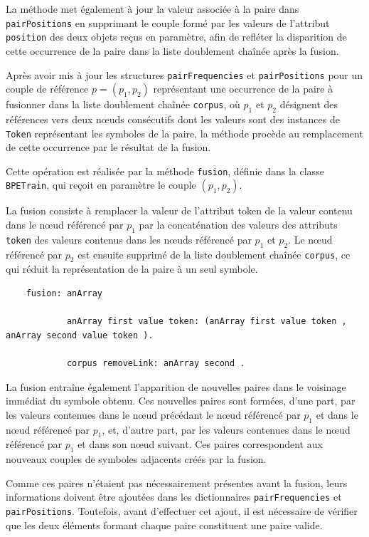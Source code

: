 \documentclass[12pt,a4paper]{report}
\begin{document}
	La méthode met également à jour la valeur associée à la paire dans \texttt{pairPositions} en supprimant le couple formé par les valeurs de l’attribut \texttt{position} des deux objets reçus en paramètre, afin de refléter la disparition de cette occurrence de la paire dans la liste doublement chaînée après la fusion.
	
	Après avoir mis à jour les structures \texttt{pairFrequencies} et \texttt{pairPositions} pour un couple de référence $p=(p_1, p_2)$ représentant une occurrence de la paire à fusionner dans la liste doublement chaînée \texttt{corpus}, où $p_1$ et $p_2$ désignent des références vers deux nœuds consécutifs dont les valeurs sont des instances de \texttt{Token} représentant les symboles de la paire, la méthode procède au remplacement de cette occurrence par le résultat de la fusion.
	
	Cette opération est réalisée par la méthode \texttt{fusion}, définie dans la classe \texttt{BPETrain}, qui reçoit en paramètre le couple $(p_1, p_2)$.
	
	La fusion consiste à remplacer la valeur de l’attribut token de la valeur contenu dans le nœud référencé par $p_1$ par la concaténation des valeurs des attributs \texttt{token} des valeurs contenus dans les nœuds référencé par $p_1$ et $p_2$. Le nœud référencé par $p_2$ est ensuite supprimé de la liste doublement chaînée \texttt{corpus}, ce qui réduit la représentation de la paire à un seul symbole.
	
	\begin{verbatim}
	fusion: anArray
	
			anArray first value token: (anArray first value token , anArray second value token ).
			
			corpus removeLink: anArray second .
	\end{verbatim}
	
	La fusion entraîne également l’apparition de nouvelles paires dans le voisinage immédiat du symbole obtenu. Ces nouvelles paires sont formées, d’une part, par les valeurs contenues dans le nœud précédant le nœud référencé par $p_1$ et dans le nœud référencé par $p_1$, et, d’autre part, par les valeurs contenues dans le nœud référencé par $p_1$ et dans son nœud suivant. Ces paires correspondent aux nouveaux couples de symboles adjacents créés par la fusion.
	
	Comme ces paires n’étaient pas nécessairement présentes avant la fusion, leurs informations doivent être ajoutées dans les dictionnaires \texttt{pairFrequencies} et \texttt{pairPositions}. Toutefois, avant d’effectuer cet ajout, il est nécessaire de vérifier que les deux éléments formant chaque paire constituent une paire valide.
	
\end{document}
